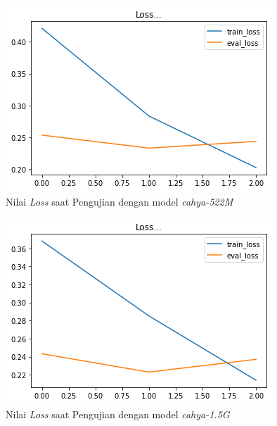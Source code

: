\begin{figure}[h]
    \begin{center}
        \includegraphics[width= 0.9\linewidth]{gambar/loss_cahya_bert_522.png}
        \caption{Nilai \textit{Loss} saat Pengujian dengan model \textit{cahya-522M}}
        \label{fig: loss_bert_cahya522}
    \end{center}
\end{figure}

\begin{figure}[h]
    \begin{center}
        \includegraphics[width= 0.9\linewidth]{gambar/loss_cahya_bert_1,5.png}
        \caption{Nilai \textit{Loss} saat Pengujian dengan model \textit{cahya-1.5G}}
        \label{fig: loss_cahya1.5}
    \end{center}
\end{figure}

